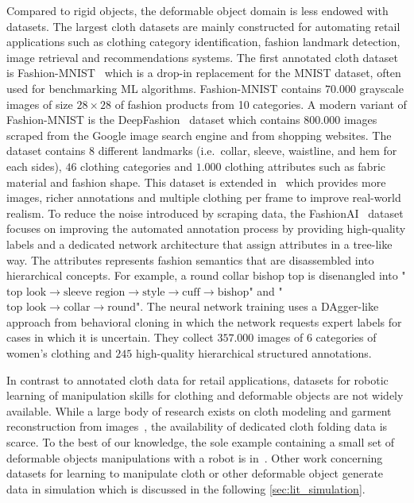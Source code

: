 \documentclass[\home/main.tex]{subfiles}
\begin{document}
Compared to rigid objects, the deformable object domain is less endowed with datasets. The largest cloth datasets are mainly constructed for automating retail applications such as clothing category identification, fashion landmark detection, image retrieval and recommendations systems. The first annotated cloth dataset is Fashion-MNIST~\autocite{fashionmnist} which is a drop-in replacement for the MNIST dataset, often used for benchmarking ML algorithms. Fashion-MNIST contains $70.000$ grayscale images of size $28\times28$ of fashion products from 10 categories. A modern variant of Fashion-MNIST is the DeepFashion~\autocite{DeepFashion} dataset which contains $800.000$ images scraped from the Google image search engine and from shopping websites. The dataset contains $8$ different landmarks (i.e.\ collar, sleeve, waistline, and hem for each sides), $46$ clothing categories and $1.000$ clothing attributes such as fabric material and fashion shape. This dataset is extended in~\autocite{DeepFashion2} which provides more images, richer annotations and multiple clothing per frame to improve real-world realism. To reduce the noise introduced by scraping data, the FashionAI~\autocite{FashionAI} dataset focuses on improving the automated annotation process by providing high-quality labels and a dedicated network architecture that assign attributes in a tree-like way. The attributes represents fashion semantics that are disassembled into hierarchical concepts. For example, a round collar bishop top is disenangled into "$\text{top look} \rightarrow \text{sleeve region} \rightarrow \text{style} \rightarrow \text{cuff} \rightarrow \text{bishop}$" and  "$\text{top look} \rightarrow \text{collar} \rightarrow \text{round}$". The neural network training uses a DAgger-like approach from behavioral cloning in which the network requests expert labels for cases in which it is uncertain. They collect $357.000$ images of $6$ categories of women's clothing and $245$ high-quality hierarchical structured annotations.

In contrast to annotated cloth data for retail applications, datasets for robotic learning of manipulation skills for clothing and deformable objects are not widely available. While a large body of research exists on cloth modeling and garment reconstruction from images~\autocite{bertiche2020cloth3d,deepfashion3d,Wang20183dgarment}, the availability of dedicated cloth folding data is scarce. To the best of our knowledge, the sole example containing a small set of deformable objects manipulations with a robot is in~\autocite{mandlekar2018roboturk}. Other work concerning datasets for learning to manipulate cloth or other deformable object generate data in simulation which is discussed in the following \cref{sec:lit_simulation}.
\end{document}
